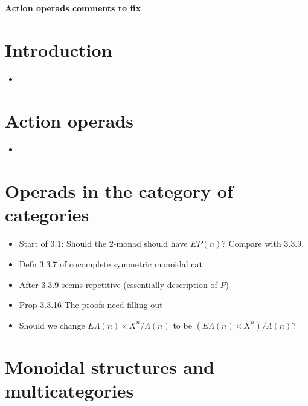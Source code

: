 \documentclass{amsart}
\begin{document}
\begin{center}
\begin{Large}
\textbf{Action operads comments to fix}
\end{Large}
\end{center}
\vskip1cm

\section{ Introduction}
\begin{itemize}
\item

\end{itemize}
\section{ Action operads}
\begin{itemize}
\item

\end{itemize}

\section{Operads in the category of categories}
\begin{itemize}
\item Start of 3.1: Should the $2$-monad should have $EP(n)$? Compare with 3.3.9.
\item Defn 3.3.7 of cocomplete symmetric monoidal cat
\item After 3.3.9 seems repetitive (essentially description of $\underline{P}$)
\item Prop 3.3.16 The proofs need filling out
\item Should we change $E\Lambda(n) \times X^n/\Lambda(n)$ to be $\left(E\Lambda(n) \times X^n\right)/\Lambda(n)$?
\end{itemize}

\section{ Monoidal structures and multicategories}
\end{document}
